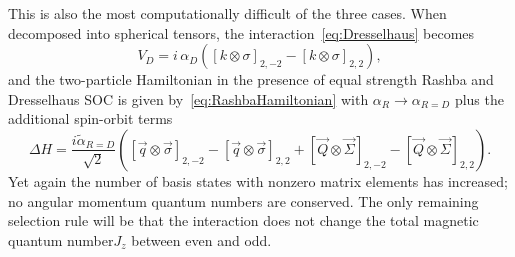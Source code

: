 \documentclass[%
 notitlepage,
 preprint,
showpacs,%
 amsmath,amssymb,
 aps,
pra,
]{revtex4-1}
\begin{document}
This is also the most computationally difficult of the three cases. When decomposed into spherical tensors, the interaction~\eqref{eq:Dresselhaus} becomes
\begin{equation}
V_D=i\,\alpha_D \left( \left[ k \otimes \sigma \right]_{2,-2}- \left[ k \otimes \sigma \right]_{2,2}\right),
\end{equation}
and the two-particle Hamiltonian in the presence of equal strength Rashba and Dresselhaus SOC is given by~\eqref{eq:RashbaHamiltonian} with $\alpha_R\rightarrow \alpha_{R=D}$ plus the additional spin-orbit terms
\begin{equation}\label{eq:DresselhausHamiltonian}
\Delta H= \frac{i \tilde{\alpha}_{R=D}}{\sqrt{2}}\left(  \left[ \vec{q} \otimes \vec{\sigma} \right]_{2,-2} -  \left[ \vec{q} \otimes \vec{\sigma} \right]_{2,2} +[ \vec{Q} \otimes \vec{\Sigma} ]_{2,-2} -  [ \vec{Q} \otimes \vec{\Sigma} ]_{2,2} \right).
\end{equation} 
Yet again the number of basis states with nonzero matrix elements has increased; no angular momentum quantum numbers are conserved. The only remaining selection rule will be that the interaction does not change the total magnetic quantum number$J_z$ between even and odd. 
\end{document}
